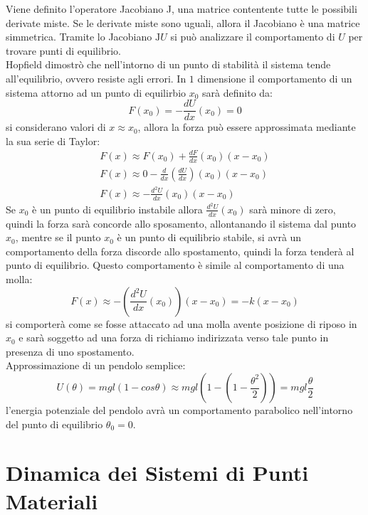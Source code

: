 \documentclass{article}
\numberwithin{equation}{subsection}
\begin{document}
Viene definito l'operatore Jacobiano J, una matrice contentente tutte 
le possibili derivate miste. Se le derivate miste sono uguali, 
allora il Jacobiano è una matrice simmetrica. Tramite lo 
Jacobiano $\mbox{J}U$ si può analizzare il comportamento di $U$ 
per trovare punti di equilibrio.\\
Hopfield dimostrò che nell'intorno di un punto di stabilità 
il sistema tende all'equilibrio, ovvero resiste agli errori. 
In $1$ dimensione il comportamento di un sistema attorno ad un 
punto di equilirbio $x_0$ sarà definito da:
\begin{equation}
    F(x_0)=-\displaystyle\frac{dU}{dx}(x_0)=0
\end{equation}
si considerano valori di $x\approx x_0$, allora la forza può 
essere approssimata mediante la sua serie di Taylor:
\begin{gather}
    F(x)\approx F(x_0)+\displaystyle\frac{dF}{dx}(x_0)(x-x_0)\\
    F(x)\approx 0-\displaystyle\frac{d}{dx}\left(\frac{dU}{dx}\right)(x_0)(x-x_0)\\
    F(x)\approx -\displaystyle\frac{d^{2}U}{dx}(x_0)(x-x_0)
\end{gather}
Se $x_0$ è un punto di equilibrio instabile allora $\displaystyle\frac{d^{2}U}{dx}(x_0)$ 
sarà minore di zero, quindi la forza sarà concorde allo 
sposamento, allontanando il sistema dal punto $x_0$, mentre 
se il punto $x_0$ è un punto di equilibrio stabile, si avrà 
un comportamento della forza discorde allo spostamento, quindi 
la forza tenderà al punto di equilibrio. Questo comportamento 
è simile al comportamento di una molla:
\begin{equation}
    F(x)\approx -\left(\displaystyle\frac{d^{2}U}{dx}(x_0)\right)(x-x_0)=-k(x-x_0)
\end{equation}
si comporterà come se fosse attaccato ad una molla avente 
posizione di riposo in $x_0$ e sarà soggetto ad una forza di 
richiamo indirizzata verso tale punto in presenza di uno 
spostamento. \\
Approssimazione di un pendolo semplice: 
$$U(\theta) = mgl(1-cos\theta)\approx mgl(1-(1-\displaystyle\frac{\theta^{2}}{2}))=mgl\frac{\theta}{2}$$
l'energia potenziale del pendolo avrà un comportamento parabolico 
nell'intorno del punto di equilibrio $\theta_0=0$.

\clearpage

\section{Dinamica dei Sistemi di Punti Materiali}
\end{document}
